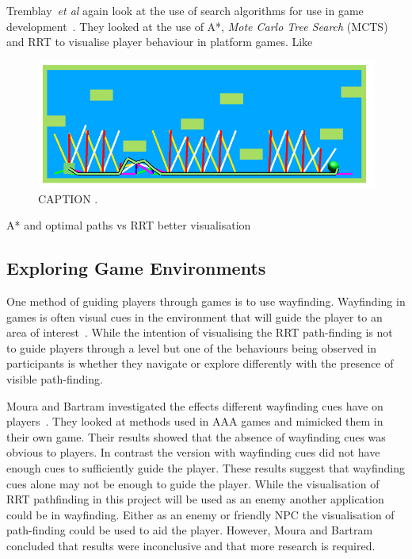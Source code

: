 \documentclass[journal]{IEEEtran}
\begin{document}
 Tremblay~\textit{et al} again look at the use of search algorithms for use in game development~\cite{Tremblay2014}. They looked at the use of A*, \textit{Mote Carlo Tree Search} (MCTS) and RRT to visualise player behaviour in platform games. Like 

\begin{figure}[h]
	\includegraphics[width=1.0\linewidth]{Tremblay2014.png}
	\caption{ CAPTION \cite{Tremblay2014}.}
	\label{Tremblay2014}
\end{figure} 

A* and optimal paths vs RRT better visualisation 


\subsection{Exploring Game Environments}
One method of guiding players through games is to use wayfinding. Wayfinding in games is often visual cues in the environment that will guide the player to an area of interest~\cite{si2017, Bacim2008}. While the intention of visualising the RRT path-finding is not to guide players through a level but one of the behaviours being observed in participants is whether they  navigate or explore differently with the presence of visible path-finding. 

Moura and Bartram investigated the effects different wayfinding cues have on players~\cite{moura2014}.  They looked at methods used in AAA games and mimicked them in their own game. Their results showed that the absence of wayfinding cues was obvious to players. In contrast the version with wayfinding cues did not have enough cues to sufficiently guide the player. These results suggest that wayfinding cues alone may not be enough to guide the player. While the visualisation of RRT pathfinding in this project will be used as an enemy another application could be in wayfinding. Either as an enemy or friendly NPC the visualisation of path-finding could be used to aid the player. However, Moura and Bartram concluded that results were inconclusive and that more research is required. 
 
\end{document}
